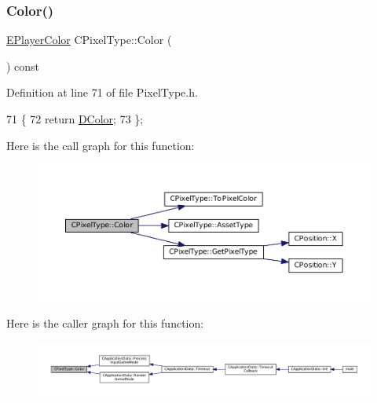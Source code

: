 \subsubsection{\texorpdfstring{Color()}{Color()}}
{\footnotesize\ttfamily \hyperlink{GameDataTypes_8h_aafb0ca75933357ff28a6d7efbdd7602f}{E\+Player\+Color} C\+Pixel\+Type\+::\+Color (\begin{DoxyParamCaption}{ }\end{DoxyParamCaption}) const\hspace{0.3cm}{\ttfamily [inline]}}



Definition at line 71 of file Pixel\+Type.\+h.


\begin{DoxyCode}
71                                   \{
72             \textcolor{keywordflow}{return} \hyperlink{classCPixelType_a474243cf748aee94cfa207659e940b6c}{DColor};  
73         \};
\end{DoxyCode}
Here is the call graph for this function\+:
\nopagebreak
\begin{figure}[H]
\begin{center}
\leavevmode
\includegraphics[width=350pt]{classCPixelType_a54864220447608dfad4cd579a5a4016c_cgraph}
\end{center}
\end{figure}
Here is the caller graph for this function\+:
\nopagebreak
\begin{figure}[H]
\begin{center}
\leavevmode
\includegraphics[width=350pt]{classCPixelType_a54864220447608dfad4cd579a5a4016c_icgraph}
\end{center}
\end{figure}
\hypertarget{classCPixelType_af38a22feec4bef33deeb628b0877d464}{}\label{classCPixelType_af38a22feec4bef33deeb628b0877d464} 
